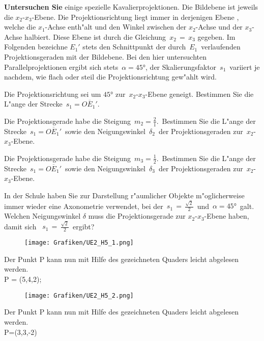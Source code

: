 \begin{Aufgabe}
\label{Analyse_KavProj}%
\textbf{Untersuchen Sie} einige spezielle Kavalierprojektionen. Die Bildebene ist jeweils die $x_2$-$x_3$-Ebene. Die Projektionsrichtung liegt immer in derjenigen Ebene , welche die $x_1$-Achse enth"alt und den Winkel zwischen der $x_2$-Achse und der $x_3$-Achse halbiert. Diese Ebene ist durch die Gleichung \,$x_2\,=\,x_3$ gegeben. Im Folgenden bezeichne $E_1'$ stets den Schnittpunkt der durch \,$E_1$\, verlaufenden Projektionsgeraden mit der Bildebene. Bei den hier untersuchten Parallelprojektionen ergibt sich stets \,$\alpha = \ang{45}$, der Skalierungsfaktor \,$s_1$\, variiert je nachdem, wie flach oder steil die Projektionsrichtung gew"ahlt wird.
\begin{Teilaufgaben}
\item Die Projektionsrichtung sei um $\ang{45}$ zur \,$x_2$-$x_3$-Ebene geneigt. Bestimmen Sie die L"ange der Strecke \,$s_1= \overline{OE_1'}$.
\item Die Projektionsgerade habe die Steigung \,$m_2 = \frac{2}{1}$.\, Bestimmen Sie die L"ange der Strecke \,$s_1=\overline{OE_1'}$\, sowie den Neigungswinkel \,$\delta_2$\, der Projektionsgeraden zur \,$x_2$-$x_3$-Ebene.
\item Die Projektionsgerade habe die Steigung \,$m_3 = \frac{1}{2}$.\, Bestimmen Sie die L"ange der Strecke \,$s_1=\overline{OE_1'}$\, sowie den Neigungswinkel \,$\delta_3$\, der Projektionsgeraden zur \,$x_2$-$x_3$-Ebene.
\item In der Schule haben Sie zur Darstellung  r"aumlicher Objekte m"oglicherweise immer wieder eine Axonometrie verwendet, bei der \,$s_1\,=\,\tfrac{\sqrt{2}}{2}$\, und \,$\alpha = \ang{45}$\, galt. Welchen Neigungswinkel $\delta$ muss die Projektionsgerade zur $x_2$-$x_3$-Ebene haben, damit sich \, $s_1\,=\,\tfrac{\sqrt{2}}{2}$\, ergibt?
\end{Teilaufgaben}
\end{Aufgabe}
\begin{Loesung}
	\begin{figure}[H]
		\centering
		\texttt{[image: Grafiken/UE2\_H5\_1.png]}
		\label{fig.H5_1}
	\end{figure}
Der Punkt P kann nun mit Hilfe des gezeichneten Quaders leicht abgelesen werden.\\
P = (5,4,2);\\
\pagebreak

\begin{figure}[H]
		\centering
		\texttt{[image: Grafiken/UE2\_H5\_2.png]}
		\label{fig.H5_2}
	\end{figure}
Der Punkt P kann nun mit Hilfe des gezeichneten Quaders leicht abgelesen werden.\\
P=(3,3,-2)
\end{Loesung}
